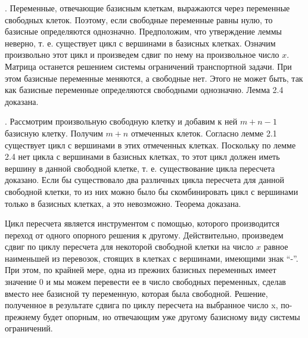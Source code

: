 . Переменные, отвечающие базисным клеткам, выражаются через переменные свободных клеток. Поэтому, если свободные переменные равны нулю, то базисные определяются однозначно. Предположим, что утверждение леммы неверно, т. е. существует цикл с вершинами в базисных клетках. Означим произвольно этот цикл и произведем сдвиг по нему на произвольное число $x$. Матрица останется решением системы ограничений транспортной задачи. При этом базисные переменные меняются, а свободные нет. Этого не может быть, так как базисные переменные определяются свободными однозначно. Лемма 2.4 доказана.%



. Рассмотрим произвольную свободную клетку и добавим к ней $m + n - 1$ базисную клетку. Получим $m + n$ отмеченных клеток. Согласно лемме 2.1 существует цикл с вершинами в этих отмеченных клетках. Поскольку по лемме 2.4 нет цикла с вершинами в базисных клетках, то этот цикл должен иметь вершину в данной свободной клетке, т. е. существование цикла пересчета доказано. Если бы существовало два различных цикла пересчета для данной свободной клетки, то из них можно было бы скомбинировать цикл с вершинами только в базисных клетках, а это невозможно. Теорема доказана.%

Цикл пересчета является инструментом с помощью, которого производится переход от одного опорного решения к другому. Действительно, произведем сдвиг по циклу пересчета для некоторой свободной клетки на число $x$ равное наименьшей из перевозок, стоящих в клетках с вершинами, имеющими знак “-”. При этом, по крайней мере, одна из прежних базисных переменных имеет значение 0 и мы можем перевести ее в число свободных  переменных, сделав  вместо нее базисной ту переменную, которая была свободной. Решение, полученное в результате сдвига по циклу пересчета на выбранное число x, по-прежнему будет опорным, но отвечающим уже другому базисному виду системы ограничений.


